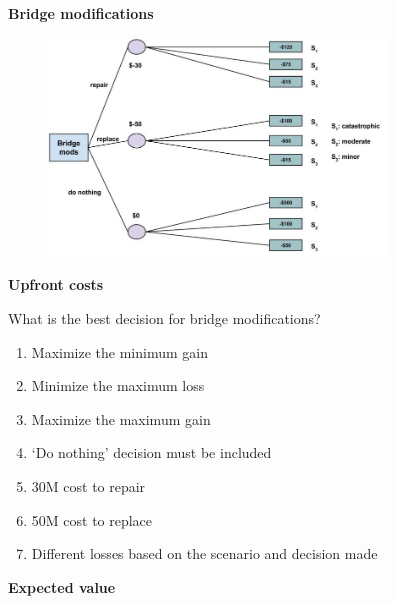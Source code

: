 \documentclass[aspectratio=1610,pdftex,dvipsnames,compress,xcolor={dvipsnames}]{beamer}
\begin{document}
\begin{frame}[plain]{}
    \centering\LARGE\textbf{Bridge modifications}
\end{frame}


\addtocounter{framenumber}{-1}
\begin{frame}{}
    \begin{figure}
        \centering
        \includegraphics[width=0.80\textwidth]{bridge.mods.jpg}
    \end{figure}
\end{frame}


\begin{frame}[plain]{}
    \centering\LARGE\textbf{Upfront costs}
\end{frame}


\addtocounter{framenumber}{-1}
\begin{frame}{What is the best decision for bridge modifications?}
    \begin{enumerate}[series=outerlist,topsep=0pt,itemsep=15pt,leftmargin=*,label=(\arabic*)]
        \item[]Maximize the minimum gain
        \item[]Minimize the maximum loss
        \item[]Maximize the maximum gain
        \item[]`Do nothing' decision must be included
        \item[]30M cost to repair
        \item[]50M cost to replace
        \item[]Different losses based on the scenario and decision made
    \end{enumerate}
\end{frame}


\begin{frame}[plain]{}
    \centering\LARGE\textbf{Expected value}
\end{frame}
\end{document}

